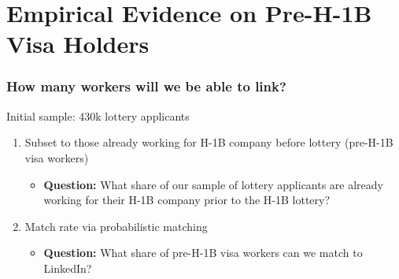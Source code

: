 \documentclass[xcolor=dvipsnames, compress, 12pt, aspectratio=169, handout]{beamer}
\begin{document}
\section{Empirical Evidence on Pre-H-1B Visa Holders}
\begin{frame}
    \frametitle{How many workers will we be able to link?}
    Initial sample: 430k lottery applicants
    \vspace{3mm}
    \begin{enumerate}
        \item Subset to those already working for H-1B company before lottery (pre-H-1B visa workers)
        \begin{itemize}
            \item \textbf{Question:} What share of our sample of lottery applicants are already working for their H-1B company prior to the H-1B lottery?
        \end{itemize}
        \vspace{3mm}
        \item Match rate via probabilistic matching
        \begin{itemize}
            \item \textbf{Question:} What share of pre-H-1B visa workers can we match to LinkedIn?
        \end{itemize} 
    \end{enumerate}    
\end{frame}
\end{document}
